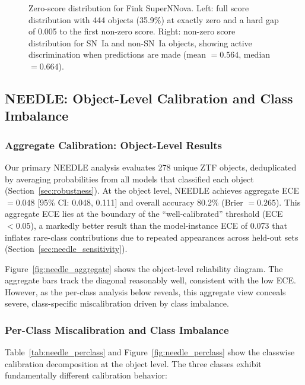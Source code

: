 \documentclass[twocolumn]{aastex631}
\begin{document}
\begin{figure}
\caption{Zero-score distribution for Fink SuperNNova. Left: full score distribution with 444 objects (35.9\%) at exactly zero and a hard gap of 0.005 to the first non-zero score. Right: non-zero score distribution for SN~Ia and non-SN~Ia objects, showing active discrimination when predictions are made (mean $= 0.564$, median $= 0.664$). \label{fig:fink_snn_hist}}
\end{figure}


\subsection{NEEDLE: Object-Level Calibration and Class Imbalance} \label{sec:needle}

\subsubsection{Aggregate Calibration: Object-Level Results}

Our primary NEEDLE analysis evaluates 278 unique ZTF objects, deduplicated by averaging probabilities from all models that classified each object (Section~\ref{sec:robustness}). At the object level, NEEDLE achieves aggregate ECE $= 0.048$ [95\% CI: 0.048, 0.111] and overall accuracy 80.2\% (Brier $= 0.265$). This aggregate ECE lies at the boundary of the ``well-calibrated'' threshold (ECE $< 0.05$), a markedly better result than the model-instance ECE of 0.073 that inflates rare-class contributions due to repeated appearances across held-out sets (Section~\ref{sec:needle_sensitivity}).

Figure~\ref{fig:needle_aggregate} shows the object-level reliability diagram. The aggregate bars track the diagonal reasonably well, consistent with the low ECE. However, as the per-class analysis below reveals, this aggregate view conceals severe, class-specific miscalibration driven by class imbalance.

\subsubsection{Per-Class Miscalibration and Class Imbalance} \label{sec:needle_perclass}

Table~\ref{tab:needle_perclass} and Figure~\ref{fig:needle_perclass} show the classwise calibration decomposition at the object level. The three classes exhibit fundamentally different calibration behavior:
\end{document}
